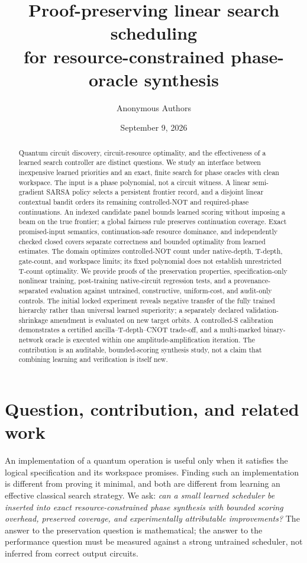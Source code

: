 \documentclass[11pt]{article}
\title{Proof-preserving linear search scheduling\\for resource-constrained phase-oracle synthesis}
\author{Anonymous Authors}
\date{September 9, 2026}
\theoremstyle{definition}\newtheorem{definition}[theorem]{Definition}
\begin{document}
\maketitle
\begin{abstract}
Quantum circuit discovery, circuit-resource optimality, and the effectiveness of a learned search controller are distinct questions. We study an interface between inexpensive learned priorities and an exact, finite search for phase oracles with clean workspace. The input is a phase polynomial, not a circuit witness. A linear semi-gradient SARSA policy selects a persistent frontier record, and a disjoint linear contextual bandit orders its remaining controlled-NOT and required-phase continuations. An indexed candidate panel bounds learned scoring without imposing a beam on the true frontier; a global fairness rule preserves continuation coverage. Exact promised-input semantics, continuation-safe resource dominance, and independently checked closed covers separate correctness and bounded optimality from learned estimates. The domain optimizes controlled-NOT count under native-depth, T-depth, gate-count, and workspace limits; its fixed polynomial does not establish unrestricted T-count optimality. We provide proofs of the preservation properties, specification-only nonlinear training, post-training native-circuit regression tests, and a provenance-separated evaluation against untrained, constructive, uniform-cost, and audit-only controls. The initial locked experiment reveals negative transfer of the fully trained hierarchy rather than universal learned superiority; a separately declared validation-shrinkage amendment is evaluated on new target orbits. A controlled-S calibration demonstrates a certified ancilla--T-depth--CNOT trade-off, and a multi-marked binary-network oracle is executed within one amplitude-amplification iteration. The contribution is an auditable, bounded-scoring synthesis study, not a claim that combining learning and verification is itself new.
\end{abstract}

\section{Question, contribution, and related work}
An implementation of a quantum operation is useful only when it satisfies the logical specification and its workspace promises. Finding such an implementation is different from proving it minimal, and both are different from learning an effective classical search strategy. We ask: \emph{can a small learned scheduler be inserted into exact resource-constrained phase synthesis with bounded scoring overhead, preserved coverage, and experimentally attributable improvements?} The answer to the preservation question is mathematical; the answer to the performance question must be measured against a strong untrained scheduler, not inferred from correct output circuits.
\end{document}
